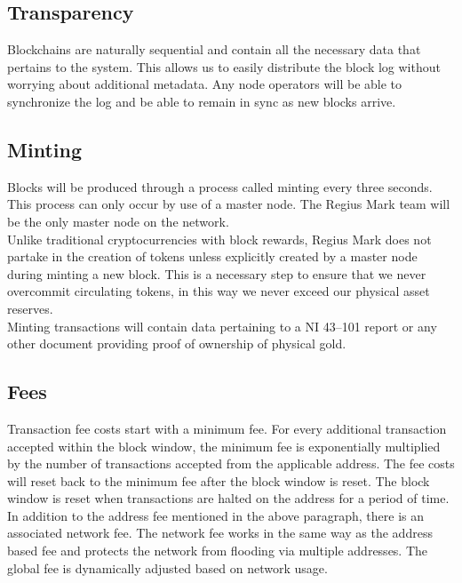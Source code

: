 \documentclass[12pt,a4paper]{article}
\begin{document}
  \subsection{Transparency}
  Blockchains are naturally sequential and contain all the necessary data that
  pertains to the system. This allows us to easily distribute the block log
  without worrying about additional metadata. Any node operators will be able to
  synchronize the log and be able to remain in sync as new blocks arrive.

  \subsection{Minting}
  Blocks will be produced through a process called minting every three seconds.
  This process can only occur by use of a master node. The Regius Mark team will
  be the only master node on the network.\\

  Unlike traditional cryptocurrencies with block rewards, Regius Mark does not
  partake in the creation of tokens unless explicitly created by a master node
  during minting a new block. This is a necessary step to ensure that we never
  overcommit circulating tokens, in this way we never exceed our physical asset
  reserves.\\

  Minting transactions will contain data pertaining to a NI 43--101 report or
  any other document providing proof of ownership of physical gold.

  \subsection{Fees}
  Transaction fee costs start with a minimum fee. For every additional
  transaction accepted within the block window, the minimum fee is exponentially
  multiplied by the number of transactions accepted from the applicable address.
  The fee costs will reset back to the minimum fee after the block window is
  reset. The block window is reset when transactions are halted on the address
  for a period of time.\\

  In addition to the address fee mentioned in the above paragraph, there is an
  associated  network fee. The network fee works in the same way as
  the address based fee and protects the network from flooding via multiple
  addresses. The global fee is dynamically adjusted based on network usage.\\
\end{document}
